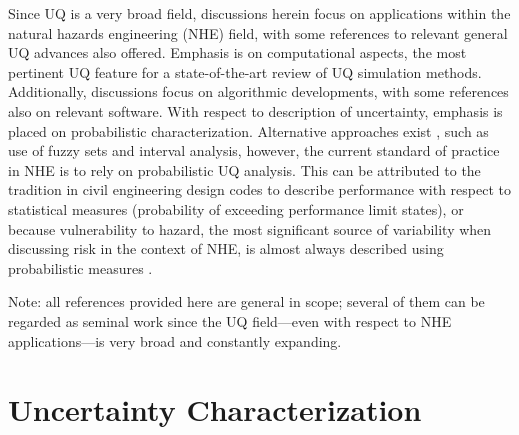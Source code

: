 Since UQ is a very broad field, discussions herein focus on applications within the natural hazards engineering (NHE) field, with some references to relevant general UQ advances also offered. Emphasis is on computational aspects, the most pertinent UQ feature for a state-of-the-art review of UQ simulation methods. Additionally, discussions focus on algorithmic developments, with some references also on relevant software. With respect to description of uncertainty, emphasis is placed on probabilistic characterization. Alternative approaches exist \citep{beer2013imprecise}, such as use of fuzzy sets and interval analysis, however, the current standard of practice in NHE is to rely on probabilistic UQ analysis. This can be attributed to the tradition in civil engineering design codes to describe performance with respect to statistical measures (probability of exceeding performance limit states), or because vulnerability to hazard, the most significant source of variability when discussing risk in the context of NHE, is almost always described using probabilistic measures \citep{mcguire2004seismic, resio2007white}. 

Note: all references provided here are general in scope; several of them can be regarded as seminal work since the UQ field---even with respect to NHE applications---is very broad and constantly expanding.    

\section{Uncertainty Characterization}
\label{sec:uq_characterization}

